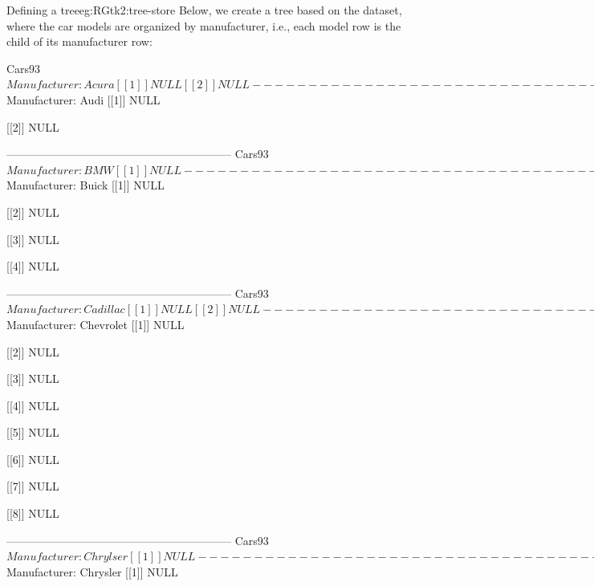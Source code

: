 \begin{example}{Defining a tree}{eg:RGtk2:tree-store}
  Below, we create a tree based on the  dataset, where
  the car models are organized by manufacturer, i.e., each model row
  is the child of its manufacturer row:
\begin{Schunk}
\begin{Soutput}
Cars93$Manufacturer: Acura
[[1]]
NULL

[[2]]
NULL

------------------------------------------------------------ 
Cars93$Manufacturer: Audi
[[1]]
NULL

[[2]]
NULL

------------------------------------------------------------ 
Cars93$Manufacturer: BMW
[[1]]
NULL

------------------------------------------------------------ 
Cars93$Manufacturer: Buick
[[1]]
NULL

[[2]]
NULL

[[3]]
NULL

[[4]]
NULL

------------------------------------------------------------ 
Cars93$Manufacturer: Cadillac
[[1]]
NULL

[[2]]
NULL

------------------------------------------------------------ 
Cars93$Manufacturer: Chevrolet
[[1]]
NULL

[[2]]
NULL

[[3]]
NULL

[[4]]
NULL

[[5]]
NULL

[[6]]
NULL

[[7]]
NULL

[[8]]
NULL

------------------------------------------------------------ 
Cars93$Manufacturer: Chrylser
[[1]]
NULL

------------------------------------------------------------ 
Cars93$Manufacturer: Chrysler
[[1]]
NULL


\end{Soutput}
\end{Schunk}
\end{example}
